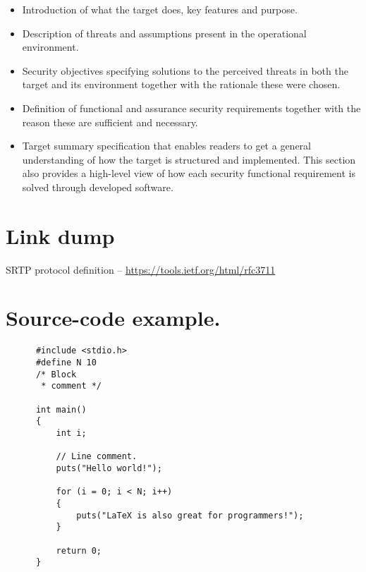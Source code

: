 \documentclass[10pt]{article}
\begin{document}
        \begin{itemize}
          \item{Introduction of what the target does, key features and purpose.}
          \item{Description of threats and assumptions present in the
            operational environment.}
          \item{Security objectives specifying solutions to the perceived
            threats in both the target and its environment together with the
            rationale these were chosen.}
          \item{Definition of functional and assurance security requirements
            together with the reason these are sufficient and necessary.}
          \item{Target summary specification that enables readers to get a
            general understanding of how the target is structured and
            implemented. This section also provides a high-level view of how
            each security functional requirement is solved through developed
            software.}
        \end{itemize}

  \section{Link dump}
    SRTP protocol definition -- \url{https://tools.ietf.org/html/rfc3711} \\

  \section{Source-code example.}
    \lstset{escapechar=@,style=customc}
    \begin{lstlisting}
      #include <stdio.h>
      #define N 10
      /* Block
       * comment */

      int main()
      {
          int i;

          // Line comment.
          puts("Hello world!");

          for (i = 0; i < N; i++)
          {
              puts("LaTeX is also great for programmers!");
          }

          return 0;
      }
    \end{lstlisting}
\end{document}
